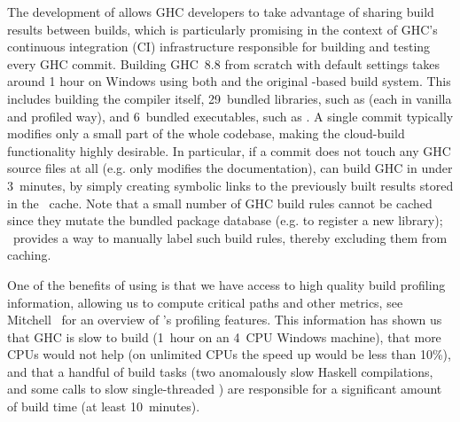 The development of \Cloud \Shake allows GHC developers to take advantage of
sharing build results between builds, which is particularly promising in the
context of GHC's continuous integration (CI) infrastructure responsible for
building and testing every GHC commit. Building GHC~8.8 from scratch with
default settings takes around 1 hour on Windows using both \Hadrian and the
original \Make-based build system. This includes building the compiler itself,
29~bundled libraries, such as  (each in vanilla and profiled way), and
6~bundled executables, such as . A single commit typically modifies
only a small part of the whole codebase, making the cloud-build functionality
highly desirable. In particular, if a commit does not touch any GHC source files
at all (e.g. only modifies the documentation), \Hadrian can build GHC in under
3~minutes, by simply creating symbolic links to the previously built results
stored in the \Cloud~\Shake cache. Note that a small number of GHC build rules
cannot be cached since they mutate the bundled package database (e.g. to
register a new library); \Cloud~\Shake provides a way to manually label such
build rules, thereby excluding them from caching.

One of the benefits of using \Shake is that we have access to high quality build
profiling information, allowing us to compute critical paths and other metrics,
see Mitchell~ for an overview of \Shake's
profiling features. This information has shown us that GHC is slow to build
(1~hour on an 4~CPU Windows machine), that more CPUs would not help (on
unlimited CPUs the speed up would be less than 10\%), and that a handful of
build tasks (two anomalously slow Haskell compilations, and some calls to slow
single-threaded ) are responsible for a significant amount of
build time (at least 10~minutes).


